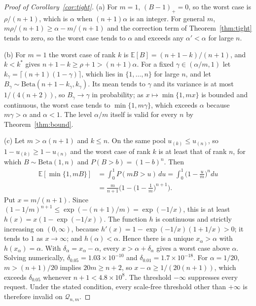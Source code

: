 \begin{proof}[Proof of Corollary~\ref{cor:tight}]
(a) For $m=1$, $(B-1)_+=0$, so the worst case is $\rho/(n+1)$, which is $\alpha$ when $(n+1)\alpha$ is an integer. For general $m$, $m\rho/(n+1)\ge\alpha-m/(n+1)$ and the correction term of Theorem~\ref{thm:tight} tends to zero, so the worst case tends to $\alpha$ and exceeds any $\alpha'<\alpha$ for large $n$.

(b) For $m=1$ the worst case of rank $k$ is $\mathbb{E}[B]=(n+1-k)/(n+1)$, and $k<k^\ast$ gives $n+1-k\ge\rho+1>(n+1)\alpha$. For a fixed $\gamma\in(\alpha/m,1)$ let $k_\gamma=\lceil(n+1)(1-\gamma)\rceil$, which lies in $\{1,\dots,n\}$ for large $n$, and let $B_\gamma\sim\mathrm{Beta}(n+1-k_\gamma,k_\gamma)$. Its mean tends to $\gamma$ and its variance is at most $1/(4(n+2))$, so $B_\gamma\to\gamma$ in probability; as $x\mapsto\min\{1,mx\}$ is bounded and continuous, the worst case tends to $\min\{1,m\gamma\}$, which exceeds $\alpha$ because $m\gamma>\alpha$ and $\alpha<1$. The level $\alpha/m$ itself is valid for every $n$ by Theorem~\ref{thm:bound}.

(c) Let $m>\alpha(n+1)$ and $k\le n$. On the same pool $u_{(k)}\le u_{(n)}$, so $1-u_{(k)}\ge1-u_{(n)}$ and the worst case of rank $k$ is at least that of rank $n$, for which $B\sim\mathrm{Beta}(1,n)$ and $P(B>b)=(1-b)^n$. Then
\begin{align*}
\mathbb{E}[\min\{1,mB\}]&=\int_0^1P(mB>u)\,du=\int_0^1\Big(1-\frac um\Big)^n du\\
&=\frac{m}{n+1}\Big(1-\Big(1-\frac1m\Big)^{n+1}\Big).
\end{align*}
Put $x=m/(n+1)$. Since $(1-1/m)^{n+1}\le\exp(-(n+1)/m)=\exp(-1/x)$, this is at least $h(x)=x(1-\exp(-1/x))$. The function $h$ is continuous and strictly increasing on $(0,\infty)$, because $h'(x)=1-\exp(-1/x)(1+1/x)>0$; it tends to $1$ as $x\to\infty$; and $h(\alpha)<\alpha$. Hence there is a unique $x_\alpha>\alpha$ with $h(x_\alpha)=\alpha$. With $\delta_\alpha=x_\alpha-\alpha$, every $x>\alpha+\delta_\alpha$ gives a worst case above $\alpha$. Solving numerically, $\delta_{0.05}=1.03\times10^{-10}$ and $\delta_{0.01}=1.7\times10^{-18}$. For $\alpha=1/20$, $m>(n+1)/20$ implies $20m\ge n+2$, so $x-\alpha\ge1/(20(n+1))$, which exceeds $\delta_{0.05}$ whenever $n+1<4.8\times10^8$. The threshold $-\infty$ suppresses every request. Under the stated condition, every scale-free threshold other than $+\infty$ is therefore invalid on $\mathcal{Q}_{n,m}$.
\end{proof}

